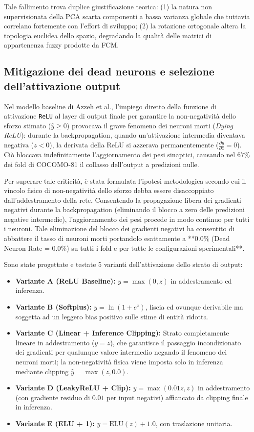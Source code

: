 \documentclass[11pt, a4paper]{article}
\begin{document}
Tale fallimento trova duplice giustificazione teorica: (1) la natura non
supervisionata della PCA scarta componenti a bassa varianza globale che
tuttavia correlano fortemente con l'effort di sviluppo; (2) la rotazione
ortogonale altera la topologia euclidea dello spazio, degradando la qualità
delle matrici di appartenenza fuzzy prodotte da FCM.\

\subsection{Mitigazione dei dead neurons e selezione dell'attivazione output}
Nel modello baseline di Azzeh et al., l'impiego diretto della funzione di attivazione \texttt{ReLU} al layer di output finale per garantire la non-negatività dello sforzo stimato ($\hat{y} \ge 0$) provocava il grave fenomeno dei neuroni morti (\textit{Dying ReLU}): durante la backpropagation, quando un'attivazione intermedia diventava negativa ($z < 0$), la derivata della ReLU si azzerava permanentemente ($\frac{\partial y}{\partial z} = 0$). Ciò bloccava indefinitamente l'aggiornamento dei pesi sinaptici, causando nel $67\%$ dei fold di COCOMO-81 il collasso dell'output a predizioni nulle.

Per superare tale criticità, è stata formulata l'ipotesi metodologica secondo cui il vincolo fisico di non-negatività dello sforzo debba essere disaccoppiato dall'addestramento della rete. Consentendo la propagazione libera dei gradienti negativi durante la backpropagation (eliminando il blocco a zero delle predizioni negative intermedie), l'aggiornamento dei pesi procede in modo continuo per tutti i neuroni. Tale eliminazione del blocco dei gradienti negativi ha consentito di abbattere il tasso di neuroni morti portandolo esattamente a **$0.0\%$ (Dead Neuron Rate = 0.0\%) su tutti i fold e per tutte le configurazioni sperimentali**.

Sono state progettate e testate 5 varianti dell'attivazione dello strato di output:
\begin{itemize}
    \item \textbf{Variante A (ReLU Baseline):} $y = \max(0, z)$ in addestramento ed inferenza.
    \item \textbf{Variante B (Softplus):} $y = \ln(1 + e^z)$, liscia ed ovunque derivabile ma soggetta ad un leggero bias positivo sulle stime di entità ridotta.
    \item \textbf{Variante C (Linear + Inference Clipping):} Strato completamente lineare in addestramento ($y = z$), che garantisce il passaggio incondizionato dei gradienti per qualunque valore intermedio negando il fenomeno dei neuroni morti; la non-negatività fisica viene imposta solo in inferenza mediante clipping $\hat{y} = \max(z, 0.0)$.
    \item \textbf{Variante D (LeakyReLU + Clip):} $y = \max(0.01z, z)$ in addestramento (con gradiente residuo di $0.01$ per input negativi) affiancato da clipping finale in inferenza.
    \item \textbf{Variante E (ELU + 1):} $y = \text{ELU}(z) + 1.0$, con traslazione unitaria.
\end{itemize}
\end{document}
